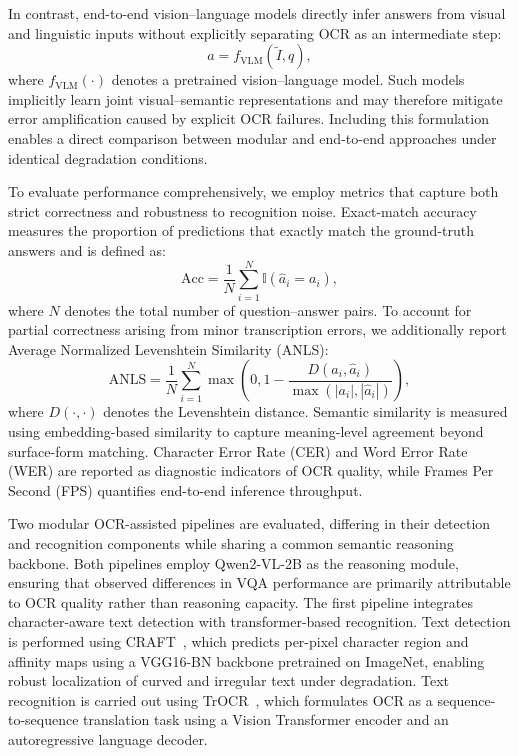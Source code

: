 \documentclass[conference]{IEEEtran}
\begin{document}
In contrast, end-to-end vision--language models directly infer answers from visual and linguistic inputs without explicitly separating OCR as an intermediate step:
\begin{equation}
a = f_{\text{VLM}}(\tilde{I}, q),
\end{equation}
where $f_{\text{VLM}}(\cdot)$ denotes a pretrained vision--language model. Such models implicitly learn joint visual--semantic representations and may therefore mitigate error amplification caused by explicit OCR failures. Including this formulation enables a direct comparison between modular and end-to-end approaches under identical degradation conditions.

To evaluate performance comprehensively, we employ metrics that capture both strict correctness and robustness to recognition noise. Exact-match accuracy measures the proportion of predictions that exactly match the ground-truth answers and is defined as:
\begin{equation}
\text{Acc} =
\frac{1}{N}
\sum_{i=1}^{N}
\mathbb{I}(\hat{a}_i = a_i),
\end{equation}
where $N$ denotes the total number of question--answer pairs. To account for partial correctness arising from minor transcription errors, we additionally report Average Normalized Levenshtein Similarity (ANLS):
\begin{equation}
\text{ANLS} =
\frac{1}{N}
\sum_{i=1}^{N}
\max\left(
0, 1 - \frac{D(a_i,\hat{a}_i)}{\max(|a_i|,|\hat{a}_i|)}
\right),
\end{equation}
where $D(\cdot,\cdot)$ denotes the Levenshtein distance. Semantic similarity is measured using embedding-based similarity to capture meaning-level agreement beyond surface-form matching. Character Error Rate (CER) and Word Error Rate (WER) are reported as diagnostic indicators of OCR quality, while Frames Per Second (FPS) quantifies end-to-end inference throughput.

Two modular OCR-assisted pipelines are evaluated, differing in their detection and recognition components while sharing a common semantic reasoning backbone. Both pipelines employ Qwen2-VL-2B as the reasoning module, ensuring that observed differences in VQA performance are primarily attributable to OCR quality rather than reasoning capacity. The first pipeline integrates character-aware text detection with transformer-based recognition. Text detection is performed using CRAFT~\cite{baek2019craft}, which predicts per-pixel character region and affinity maps using a VGG16-BN backbone pretrained on ImageNet, enabling robust localization of curved and irregular text under degradation. Text recognition is carried out using TrOCR~\cite{li2023trocr}, which formulates OCR as a sequence-to-sequence translation task using a Vision Transformer encoder and an autoregressive language decoder.
\end{document}
